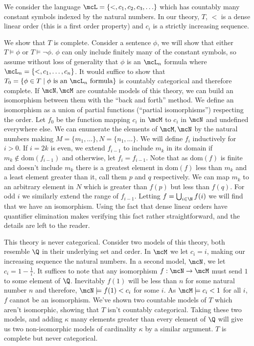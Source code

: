 \begin{example}\label{example_categoricity_sequence}
We consider the language \(\mcL = \{<, c_1, c_2, c_3, \ldots\}\) which has countably many constant symbols indexed by the natural numbers. 
In our theory, \(T\), \(<\) is a dense linear order (this is a first order property) and \(c_i\) is a strictly increasing sequence. 

We show that \(T\) is complete.
Consider a sentence \(\phi\), we will show that either \(T \models \phi\) or \(T \models \neg \phi\). 
\(\phi\) can only include finitely many of the constant symbols, so assume without loss of generality that \(\phi\) is an \(\mcL_n\) formula where \(\mcL_n = \{<, c_1, \ldots, c_n\}\).
It would suffice to show that \(T_0 = \{\phi \in T \mid \phi \text{ is an } \mcL_n \text{ formula}\}\) is countably categorical and therefore complete. 
If \(\mcN, \mcM\) are countable models of this theory, we can build an isomorphism between them with the ``back and forth'' method. 
We define an isomorphism as a union of partial functions (``partial isomorphisms'') respecting the order. 
Let \(f_0\) be the function mapping \(c_i\) in \(\mcM\) to \(c_i\) in \(\mcN\) and undefined everywhere else. 
We can enumerate the elements of \(\mcM, \mcN\) by the natural numbers making \(M = \{m_1, \ldots\}, N = \{n_1, \ldots\}\). 
We will define \(f_i\) inductively for \(i > 0\). 
If \(i=2k\) is even, we extend \(f_{i-1}\) to include \(m_{k}\) in its domain if \(m_{k} \notin \text{dom}(f_{i-1})\) and otherwise, let \(f_i = f_{i-1}\).
Note that as \(\text{dom}(f)\) is finite and doesn't include \(m_{k}\) there is a greatest element in \(\text{dom}(f)\) less than \(m_{k}\) and a least element greater than it, call them \(p\) and \(q\) respectively.
We can map \(m_{k}\) to an arbitrary element in \(N\) which is greater than \(f(p)\) but less than \(f(q)\). 
For odd \(i\) we similarly extend the range of \(f_{i-1}\). 
Letting \(f = \bigcup_{i \in \N}f(i)\) we will find that we have an isomorphism. 
Using the fact that dense linear orders have quantifier elimination \cite{mar} makes verifying this fact rather straightforward, and the details are left to the reader.
 
This theory is never categorical.
Consider two models of this theory, both resemble \(\Q\) in their underlying set and order.
In \(\mcM\) we let \(c_i = i\), making our increasing sequence the natural numbers. 
In a second model, \(\mcN\), we let \(c_i = 1 - \frac{1}{i}\).
It suffices to note that any isomorphism \(f: \mcN \to \mcM\) must send \(1\) to some element of \(\Q\).
Inevitably \(f(1)\) will be less than \(n\) for some natural number \(n\) and therefore, \(\mcN \models f(1) < c_i\) for some \(i\).
As \(\mcM \models c_i < 1\) for all \(i\), \(f\) cannot be an isomorphism. 
We've shown two countable models of \(T\) which aren't isomorphic, showing that \(T\) isn't countably categorical. 
Taking these two models, and adding \(\kappa\) many elements greater than every element of \(\Q\) will give us two non-isomorphic models of cardinality \(\kappa\) by a similar argument. \(T\) is complete but never categorical. 
\end{example}

